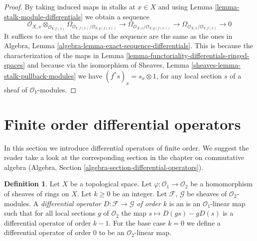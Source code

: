 \documentclass{stacks-project}
\theoremstyle{plain}
\theoremstyle{definition}
\newtheorem{definition}[subsection]{Definition}
\theoremstyle{remark}
\numberwithin{equation}{subsection}
\begin{document}
\begin{proof}
By taking induced maps in stalks at $x \in X$ and using
Lemma \ref{lemma-stalk-module-differentials} we obtain a sequence
$$
\mathcal{O}_{X, x} \otimes_{\mathcal{O}_{Y, f(x)}}
\Omega_{\mathcal{O}_{Y, f(x)}/\mathcal{O}_{S, g(f(x))}} \to
\Omega_{\mathcal{O}_{X, x}/\mathcal{O}_{S, g(f(x))}} \to
\Omega_{\mathcal{O}_{X, x}/\mathcal{O}_{Y, f(x)}} \to 0
$$
It suffices to see that the maps of the sequence are the same as
the ones in Algebra, Lemma \ref{algebra-lemma-exact-sequence-differentials}.
This is because the characterization of the maps in
Lemma \ref{lemma-functoriality-differentials-ringed-spaces}
and because via the isomorphism of
Sheaves, Lemma \ref{sheaves-lemma-stalk-pullback-modules}
we have $(f^*s)_x = s_x \otimes 1$,
for any local section $s$ of a sheaf of $\mathcal{O}_Y$-modules.
\end{proof}


















\section{Finite order differential operators}
\label{section-differential-operators}

\noindent
In this section we introduce differential operators of finite order.
We suggest the reader take a look at the corresponding section
in the chapter on commutative algebra
(Algebra, Section \ref{algebra-section-differential-operators}).

\begin{definition}
\label{definition-differential-operators}
Let $X$ be a topological space. Let $\varphi : \mathcal{O}_1 \to \mathcal{O}_2$
be a homomorphism of sheaves of rings on $X$. Let $k \geq 0$ be an integer.
Let $\mathcal{F}$, $\mathcal{G}$ be sheaves of $\mathcal{O}_2$-modules.
A {\it differential operator $D : \mathcal{F} \to \mathcal{G}$ of order $k$}
is an is an $\mathcal{O}_1$-linear map such that for all local sections
$g$ of $\mathcal{O}_2$ the map $s \mapsto D(gs) - gD(s)$ is a
differential operator of order $k - 1$. For the base case $k = 0$
we define a differential operator of order $0$ to be an
$\mathcal{O}_2$-linear map.
\end{definition}
\end{document}
